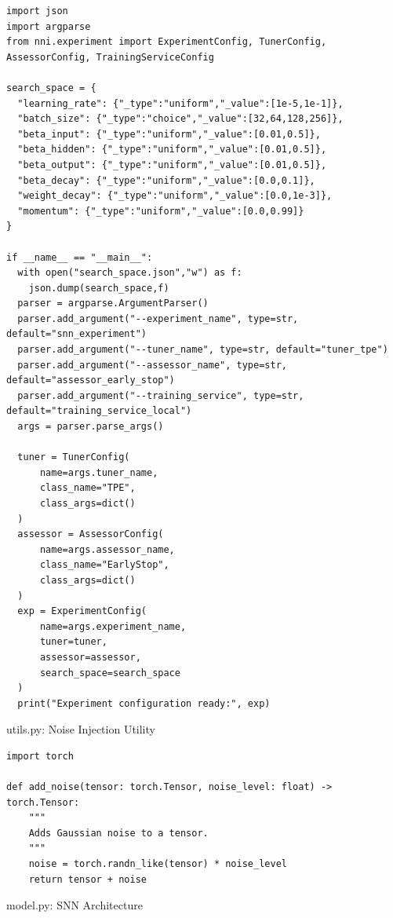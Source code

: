 \begin{lstlisting}
import json
import argparse
from nni.experiment import ExperimentConfig, TunerConfig, AssessorConfig, TrainingServiceConfig

search_space = {
  "learning_rate": {"_type":"uniform","_value":[1e-5,1e-1]},
  "batch_size": {"_type":"choice","_value":[32,64,128,256]},
  "beta_input": {"_type":"uniform","_value":[0.01,0.5]},
  "beta_hidden": {"_type":"uniform","_value":[0.01,0.5]},
  "beta_output": {"_type":"uniform","_value":[0.01,0.5]},
  "beta_decay": {"_type":"uniform","_value":[0.0,0.1]},
  "weight_decay": {"_type":"uniform","_value":[0.0,1e-3]},
  "momentum": {"_type":"uniform","_value":[0.0,0.99]}
}

if __name__ == "__main__":
  with open("search_space.json","w") as f:
    json.dump(search_space,f)
  parser = argparse.ArgumentParser()
  parser.add_argument("--experiment_name", type=str, default="snn_experiment")
  parser.add_argument("--tuner_name", type=str, default="tuner_tpe")
  parser.add_argument("--assessor_name", type=str, default="assessor_early_stop")
  parser.add_argument("--training_service", type=str, default="training_service_local")
  args = parser.parse_args()

  tuner = TunerConfig(
      name=args.tuner_name,
      class_name="TPE",
      class_args=dict()
  )
  assessor = AssessorConfig(
      name=args.assessor_name,
      class_name="EarlyStop",
      class_args=dict()
  )
  exp = ExperimentConfig(
      name=args.experiment_name,
      tuner=tuner,
      assessor=assessor,
      search_space=search_space
  )
  print("Experiment configuration ready:", exp)
\end{lstlisting}

utils.py: Noise Injection Utility

\begin{lstlisting}
import torch

def add_noise(tensor: torch.Tensor, noise_level: float) -> torch.Tensor:
    """
    Adds Gaussian noise to a tensor.
    """
    noise = torch.randn_like(tensor) * noise_level
    return tensor + noise
\end{lstlisting}

model.py: SNN Architecture

